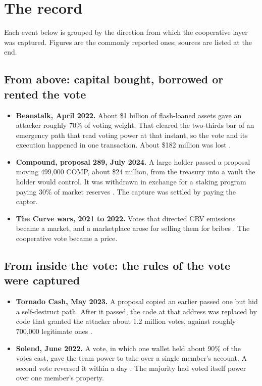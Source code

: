 \documentclass[11pt]{article}
\begin{document}
\section{The record}

Each event below is grouped by the direction from which the cooperative layer was captured. Figures are the commonly reported ones; sources are listed at the end.

\subsection{From above: capital bought, borrowed or rented the vote}

\begin{itemize}
\item \textbf{Beanstalk, April 2022.} About \$1 billion of flash-loaned assets gave an attacker roughly 70\% of voting weight. That cleared the two-thirds bar of an emergency path that read voting power at that instant, so the vote and its execution happened in one transaction. About \$182 million was lost \cite{beanstalk,veridise}.
\item \textbf{Compound, proposal 289, July 2024.} A large holder passed a proposal moving 499{,}000 COMP, about \$24 million, from the treasury into a vault the holder would control. It was withdrawn in exchange for a staking program paying 30\% of market reserves \cite{compound}. The capture was settled by paying the captor.
\item \textbf{The Curve wars, 2021 to 2022.} Votes that directed CRV emissions became a market, and a marketplace arose for selling them for bribes \cite{curve}. The cooperative vote became a price.
\end{itemize}

\subsection{From inside the vote: the rules of the vote were captured}

\begin{itemize}
\item \textbf{Tornado Cash, May 2023.} A proposal copied an earlier passed one but hid a self-destruct path. After it passed, the code at that address was replaced by code that granted the attacker about 1.2 million votes, against roughly 700{,}000 legitimate ones \cite{tornado}.
\item \textbf{Solend, June 2022.} A vote, in which one wallet held about 90\% of the votes cast, gave the team power to take over a single member's account. A second vote reversed it within a day \cite{solend}. The majority had voted itself power over one member's property.
\end{itemize}
\end{document}
